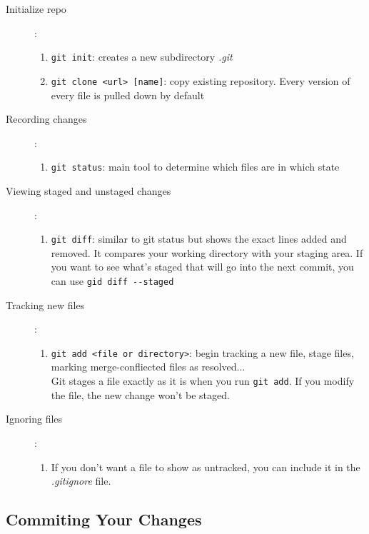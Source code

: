 \documentclass[french]{article}
\begin{document}
\begin{description}
    \item[Initialize repo]:
        \begin{enumerate}
            \item[-] \lstinline{git init}: creates a new subdirectory \emph{.git}
            \item[-] \lstinline{git clone <url> [name]}: copy existing repository. Every version of every file is pulled down by default
        \end{enumerate}
    \item[Recording changes]:
        \begin{enumerate}
            \item[-] \lstinline{git status}: main tool to determine which files are in which state
        \end{enumerate}
    \item[Viewing staged and unstaged changes]:
        \begin{enumerate}
            \item[-] \lstinline{git diff}: similar to git status but shows the exact lines added and removed. It compares your working directory with your staging area. If you want to see what's staged that will go into the next commit, you can use \lstinline{gid diff --staged}
        \end{enumerate}
    \item[Tracking new files]:
        \begin{enumerate}
            \item[-] \lstinline{git add <file or directory>}: begin tracking a new file, stage files, marking merge-confliected files as resolved... \\
                Git stages a file exactly as it is when you run \lstinline{git add}. If you modify the file, the new change won't be staged.
        \end{enumerate}
    \item[Ignoring files]:
        \begin{enumerate}
            \item[-] If you don't want a file to show as untracked, you can include it in the \emph{.gitignore} file.
        \end{enumerate}
\end{description}

\subsection{Commiting Your Changes}
\end{document}
